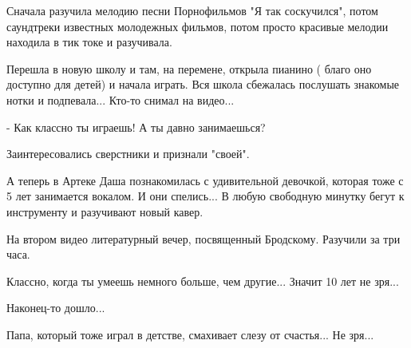Сначала разучила мелодию песни Порнофильмов "Я так соскучился", потом
саундтреки известных молодежных фильмов, потом просто красивые мелодии находила
в тик токе и разучивала. 

Перешла в новую школу и там, на перемене, открыла пианино ( благо оно доступно
для детей) и начала играть. Вся школа сбежалась послушать знакомые нотки и
подпевала... Кто-то снимал на видео...

- Как классно ты играешь! А ты давно занимаешься?

Заинтересовались сверстники и признали "своей".

А теперь в Артеке Даша познакомилась с удивительной девочкой, которая тоже с 5
лет занимается вокалом. И они спелись... В любую свободную  минутку бегут к
инструменту и разучивают новый кавер. 

На втором видео литературный вечер, посвященный Бродскому. Разучили за три
часа. 

Классно, когда ты умеешь немного больше, чем другие... Значит 10 лет не зря...

Наконец-то дошло...

Папа, который тоже играл в детстве, смахивает слезу от счастья... Не зря...

